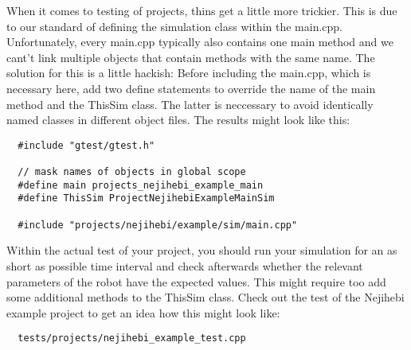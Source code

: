 When it comes to testing of projects, thins get a little more trickier.
This is due to our standard of defining the simulation class within the 
main.cpp.
Unfortunately, every main.cpp typically also contains one main method and we 
cant't link multiple objects that contain methods with the same name.
The solution for this is a little hackish:
Before including the main.cpp, which is necessary here, add two define 
statements to override the name of the main method and the ThisSim class.
The latter is neccessary to avoid identically named classes in different object
files.
The results might look like this:
\begin{lstlisting}
  #include "gtest/gtest.h"

  // mask names of objects in global scope
  #define main projects_nejihebi_example_main
  #define ThisSim ProjectNejihebiExampleMainSim

  #include "projects/nejihebi/example/sim/main.cpp"
\end{lstlisting}
Within the actual test of your project, you should run your simulation for an as
short as possible time interval and check afterwards whether the relevant 
parameters of the robot have the expected values.
This might require too add some additional methods to the ThisSim class.
Check out the test of the Nejihebi example project to get an idea how this might
look like:
\begin{lstlisting}
  tests/projects/nejihebi_example_test.cpp
\end{lstlisting}
